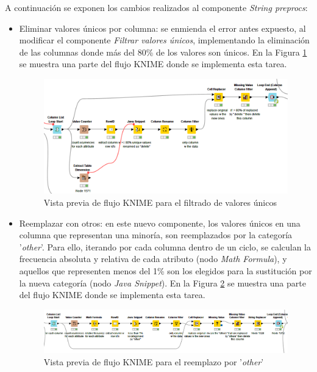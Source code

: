 A continuación se exponen los cambios realizados al componente \textit{String preprocs}:
\begin{itemize}

	\item Eliminar valores únicos por columna: se enmienda el error antes expuesto, al modificar el componente \textit{Filtrar valores únicos}, implementando la eliminación de las columnas donde más del 80\% de los valores son únicos. En la Figura \ref{fig:filtrar-valores-unicos-flujo} se muestra una parte del flujo KNIME donde se implementa esta tarea. 

	\begin{figure}[H]
		\centering
		\includegraphics[width=0.9\linewidth]{"figuras/capi 2/preprocesado/filtrar-valores-unicos-flujo"}
		\caption{Vista previa de flujo KNIME para el filtrado de valores únicos}
		\label{fig:filtrar-valores-unicos-flujo}
	\end{figure}

	\item Reemplazar con otros: en este nuevo componente, los valores únicos en una columna que representan una minoría, son reemplazados por la categoría '\textit{other}'.  Para ello, iterando por cada columna dentro de un ciclo, se calculan la frecuencia absoluta y relativa de cada atributo (nodo \textit{Math Formula}), y aquellos que representen menos del 1\% son los elegidos para la sustitución por la nueva categoría (nodo \textit{Java Snippet}). En la Figura \ref{fig:flujo-reemplazar-others} se muestra una parte del flujo KNIME donde se implementa esta tarea. 

	\begin{figure}[H]
		\centering
		\includegraphics[width=1\linewidth]{"figuras/capi 2/preprocesado/flujo-reemplazar-others"}
		\caption{Vista previa de flujo KNIME para el reemplazo por '\textit{other}'}
		\label{fig:flujo-reemplazar-others}
	\end{figure}

	
\end{itemize}


